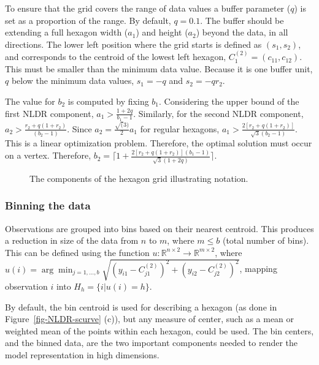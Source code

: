 \documentclass[
  12pt]{article}
\begin{document}
To ensure that the grid covers the range of data values a buffer
parameter (\(q\)) is set as a proportion of the range. By default,
\(q=0.1\). The buffer should be extending a full hexagon width (\(a_1\))
and height (\(a_2\)) beyond the data, in all directions. The lower left
position where the grid starts is defined as \((s_1, s_2)\), and
corresponds to the centroid of the lowest left hexagon,
\(C_{1}^{(2)} = (c_{11}, c_{12})\). This must be smaller than the
minimum data value. Because it is one buffer unit, \(q\) below the
minimum data values, \(s_1 = -q\) and \(s_2 = -qr_2\).

The value for \(b_2\) is computed by fixing \(b_1\). Considering the
upper bound of the first NLDR component, \(a_1 > \frac{1+2q}{b_1 -1}\).
Similarly, for the second NLDR component,
\(a_2 > \frac{r_2 + q(1 + r_2)}{(b_2 - 1)}\). Since
\(a_2 = \frac{\sqrt(3)}{2}a_1\) for regular hexagons,
\(a_1 > \frac{2[r_2 + q(1 + r_2)]}{\sqrt{3}(b_2 - 1)}\). This is a
linear optimization problem. Therefore, the optimal solution must occur
on a vertex. Therefore,
\(b_2 = \Big\lceil1 +\frac{2[r_2 + q(1 + r_2)](b_1 - 1)}{\sqrt{3}(1 + 2q)}\Big\rceil\).

\begin{figure}[H]


\caption{\label{fig-hex-param}The components of the hexagon grid
illustrating notation.}

\end{figure}%

\subsubsection{Binning the data}\label{binning-the-data}

Observations are grouped into bins based on their nearest centroid. This
produces a reduction in size of the data from \(n\) to \(m\), where
\(m\leq b\) (total number of bins). This can be defined using the
function
\(u: \mathbb{R}^{n\times 2} \rightarrow \mathbb{R}^{m\times 2}\), where
\(u(i) = \arg\min_{j = 1, \dots, b} \sqrt{(y_{i1} - C^{(2)}_{j1})^2 + (y_{i2} - C^{(2)}_{j2})^2}\),
mapping observation \(i\) into \(H_h = \{i| u(i) = h\}\).

By default, the bin centroid is used for describing a hexagon (as done
in Figure~\ref{fig-NLDR-scurve} (c)), but any measure of center, such as
a mean or weighted mean of the points within each hexagon, could be
used. The bin centers, and the binned data, are the two important
components needed to render the model representation in high dimensions.
\end{document}
